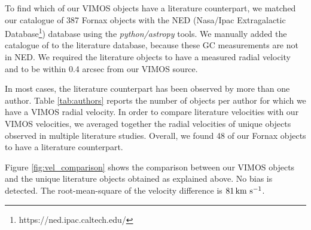 \documentclass[usenatbib]{mnras}
\newcommand{\kms}{\mbox{\,km~s$^{-1}$}}
\begin{document}
To find which of our VIMOS objects have a literature counterpart, we matched
our catalogue of 387 Fornax objects with the NED (Nasa/Ipac Extragalactic
Database\footnote{https://ned.ipac.caltech.edu/}) database using the
{\it python/astropy} tools.
We manually added the catalogue of \citet{Schuberth} to the literature
database, because these GC measurements are not in NED. We required the
literature objects to have a measured radial velocity and to be within 0.4
arcsec from our VIMOS source.

In most cases, the literature counterpart has been observed by more than one
author. Table \ref{tab:authors} reports the number of objects per author for
which we have a VIMOS radial velocity.
In order to compare literature velocities with our VIMOS velocities, we
averaged together the radial velocities of unique objects observed in multiple
literature studies.
Overall, we found 48 of our Fornax objects to have a literature counterpart.

Figure \ref{fig:vel_comparison} shows the comparison between our VIMOS
objects and the unique literature objects obtained as explained above. No
bias is detected. The root-mean-square of the velocity difference is $81 \kms$.


\end{document}
